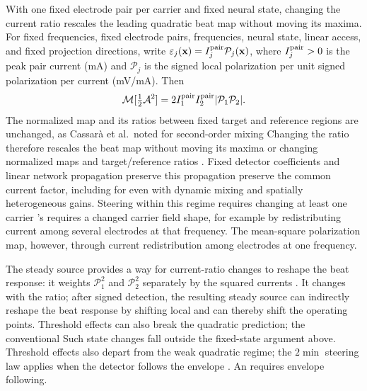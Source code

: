 \documentclass[11pt,a4paper]{article}
\providecommand{\DIFaddtex}[1]{{\protect\color{blue} \sf #1}} %
\providecommand{\DIFdeltex}[1]{{\protect\color{red} \scriptsize #1}} %
\providecommand{\DIFaddbegin}{} %
\providecommand{\DIFaddend}{} %
\providecommand{\DIFdelbegin}{} %
\providecommand{\DIFdelend}{} %
\providecommand{\DIFadd}[1]{\texorpdfstring{\DIFaddtex{#1}}{#1}} %
\providecommand{\DIFdel}[1]{\texorpdfstring{\DIFdeltex{#1}}{}} %
\begin{document}
With \DIFdelbegin \DIFdel{one fixed electrode pair per carrier and fixed neural state, changing the
current ratio rescales the leading quadratic beat map without moving its maxima.
For fixed frequencies, }\DIFdelend \DIFaddbegin \DIFadd{fixed electrode pairs, frequencies, neural state, }\DIFaddend linear access, and
\DIFdelbegin \DIFdel{fixed }\DIFdelend projection directions, write
$\varepsilon_j(\mathbf x)=I_j^{\rm pair}\mathcal P_j(\mathbf x)$,
where $I_j^{\rm pair}>0$ is \DIFdelbegin \DIFdel{the }\DIFdelend peak pair current (mA) and $\mathcal P_j$ is
\DIFdelbegin \DIFdel{the signed local polarization per unit }\DIFdelend \DIFaddbegin \DIFadd{signed polarization per }\DIFaddend current (mV/mA). Then
\[
\mathcal M[\tfrac12\mathcal A^2]
=2I_1^{\rm pair}I_2^{\rm pair}|\mathcal P_1\mathcal P_2|.
\]
\DIFdelbegin \DIFdel{The normalized map and its ratios between fixed target and reference regions are unchanged, as
Cassar\`a et al.\ noted for second-order mixing }\DIFdelend \DIFaddbegin \DIFadd{Changing the ratio therefore rescales the beat map without moving its maxima
or changing normalized maps and target/reference ratios
}\DIFaddend \cite{cassara2025part2}. Fixed detector coefficients and linear \DIFdelbegin \DIFdel{network propagation
preserve this }\DIFdelend \DIFaddbegin \DIFadd{propagation
preserve the }\DIFaddend common current factor, \DIFdelbegin \DIFdel{including for }\DIFdelend \DIFaddbegin \DIFadd{even with }\DIFaddend dynamic mixing and \DIFdelbegin \DIFdel{spatially }\DIFdelend heterogeneous
gains. Steering \DIFdelbegin \DIFdel{within this regime requires changing at least one carrier 's }\DIFdelend \DIFaddbegin \DIFadd{requires a changed carrier }\DIFaddend field shape, for example \DIFdelbegin \DIFdel{by redistributing current among several electrodes at that frequency.
The mean-square polarization map, however, }\DIFdelend \DIFaddbegin \DIFadd{through
current redistribution among electrodes at one frequency.
}

\DIFadd{The steady source provides a way for current-ratio changes to reshape the
beat response: it }\DIFaddend weights $\mathcal P_1^2$ and $\mathcal P_2^2$ \DIFdelbegin \DIFdel{separately }\DIFdelend by the squared
currents \DIFdelbegin \DIFdel{. It changes with the ratio;
after signed detection, the resulting steady source can indirectly reshape the beat response by shifting local }\DIFdelend \DIFaddbegin \DIFadd{and can thereby shift the }\DIFaddend operating points. \DIFdelbegin \DIFdel{Threshold effects can also break the quadratic prediction; the conventional }\DIFdelend \DIFaddbegin \DIFadd{Such state changes fall
outside the fixed-state argument above. Threshold effects also depart from
the weak quadratic regime; the }\DIFaddend $2\min$ steering law \DIFdelbegin \DIFdel{applies
when the detector follows the envelope . An }\DIFdelend \DIFaddbegin \DIFadd{requires envelope following.
}
\end{document}
